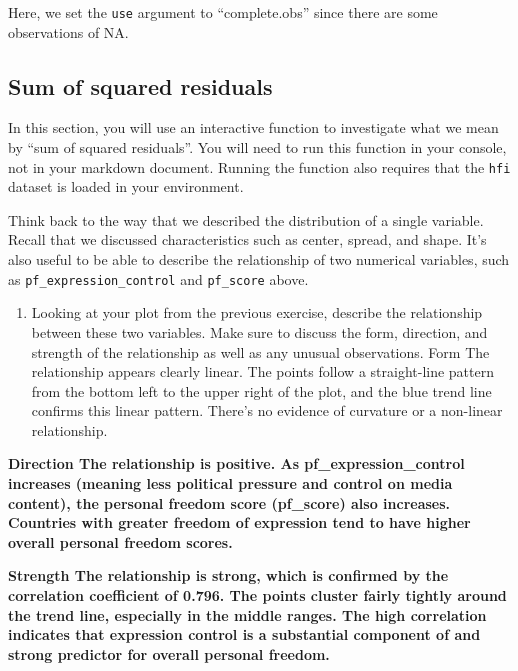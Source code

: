 \documentclass[
]{article}
\providecommand{\tightlist}{%
  \setlength{\itemsep}{0pt}\setlength{\parskip}{0pt}}
\begin{document}
Here, we set the \texttt{use} argument to ``complete.obs'' since there
are some observations of NA.

\subsection{Sum of squared residuals}\label{sum-of-squared-residuals}

\label{boxedtext}
In this section, you will use an interactive function to investigate
what we mean by ``sum of squared residuals''. You will need to run this
function in your console, not in your markdown document. Running the
function also requires that the \texttt{hfi} dataset is loaded in your
environment.

Think back to the way that we described the distribution of a single
variable. Recall that we discussed characteristics such as center,
spread, and shape. It's also useful to be able to describe the
relationship of two numerical variables, such as
\texttt{pf\_expression\_control} and \texttt{pf\_score} above.

\begin{enumerate}
\def\labelenumi{\arabic{enumi}.}
\setcounter{enumi}{2}
\tightlist
\item
  Looking at your plot from the previous exercise, describe the
  relationship between these two variables. Make sure to discuss the
  form, direction, and strength of the relationship as well as any
  unusual observations. Form The relationship appears clearly linear.
  The points follow a straight-line pattern from the bottom left to the
  upper right of the plot, and the blue trend line confirms this linear
  pattern. There's no evidence of curvature or a non-linear
  relationship.
\end{enumerate}

\textbf{Direction The relationship is positive. As
pf\_expression\_control increases (meaning less political pressure and
control on media content), the personal freedom score (pf\_score) also
increases. Countries with greater freedom of expression tend to have
higher overall personal freedom scores.}

\textbf{Strength The relationship is strong, which is confirmed by the
correlation coefficient of 0.796. The points cluster fairly tightly
around the trend line, especially in the middle ranges. The high
correlation indicates that expression control is a substantial component
of and strong predictor for overall personal freedom.}
\end{document}
